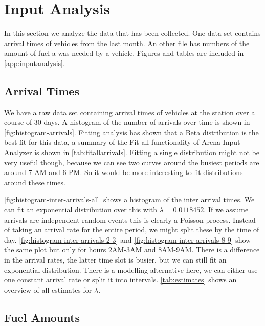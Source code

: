 \section{Input Analysis}

In this section we analyze the data that has been collected. One data set contains arrival times of vehicles from the last month. An other file has numbers of the amount of fuel a was needed by a vehicle.  Figures and tables are included in \autoref{app:inputanalysis}.

\subsection{Arrival Times}

We have a raw data set containing arrival times of vehicles at the station over a course of 30 days.
A histogram of the number of arrivals over time is shown in \autoref{fig:histogram-arrivals}.
Fitting analysis has shown that a Beta distribution is the best fit for this data, a summary of the Fit all functionality of Arena Input Analyzer is shown in \autoref{tab:fitallarrivals}.
Fitting a single distribution might not be very useful though, because we can see two curves around the busiest periods are around 7 AM and 6 PM.
So it would be more interesting to fit distributions around these times.

\autoref{fig:histogram-inter-arrivals-all} shows a histogram of the inter arrival times. We can fit an exponential distribution over this with $\lambda = 0.0118452$. If we assume arrivals are independent random events this is clearly a Poisson process. Instead of taking an arrival rate for the entire period, we might split these by the time of day. \autoref{fig:histogram-inter-arrivals-2-3} and \autoref{fig:histogram-inter-arrivals-8-9} show the same plot but only for hours 2AM-3AM and 8AM-9AM. There is a difference in the arrival rates, the latter time slot is busier, but we can still fit an exponential distribution. There is a modelling alternative here, we can either use one constant arrival rate or split it into intervals. \autoref{tab:estimates} shows an overview of all estimates for $\lambda$.


\subsection{Fuel Amounts}


